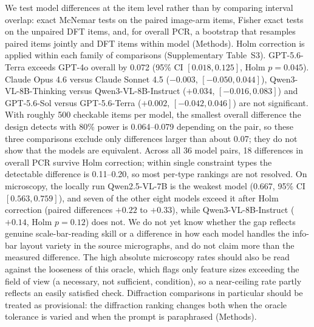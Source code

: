 \documentclass[pdflatex,sn-nature]{sn-jnl}
\newcommand{\rev}[1]{#1} %
\newcommand{\rev}[1]{{\color{blue}#1}} %
\providecommand{\DIFadd}[1]{{\protect\color{blue} \sf #1}} %
\providecommand{\DIFdel}[1]{{\protect\color{red} \scriptsize #1}} %
\providecommand{\DIFaddbegin}{} %
\providecommand{\DIFaddend}{} %
\providecommand{\DIFdelbegin}{} %
\providecommand{\DIFdelend}{} %
\providecommand{\DIFscaledelfig}{0.5}
\newlength{\DIFdelgraphicswidth} %
\newlength{\DIFdelgraphicsheight} %
\providecommand{\DIFaddincludegraphics}[2][]{{\color{blue}\fbox{\DIFOincludegraphics[#1]{#2}}}} %
\providecommand{\DIFdelincludegraphics}[2][]{%
\sbox{\DIFdelgraphicsbox}{\DIFOincludegraphics[#1]{#2}}%
\settoboxwidth{\DIFdelgraphicswidth}{\DIFdelgraphicsbox} %
\settoboxtotalheight{\DIFdelgraphicsheight}{\DIFdelgraphicsbox} %
\scalebox{\DIFscaledelfig}{%
\parbox[b]{\DIFdelgraphicswidth}{\usebox{\DIFdelgraphicsbox}\\[-\baselineskip] \rule{\DIFdelgraphicswidth}{0em}}\llap{\resizebox{\DIFdelgraphicswidth}{\DIFdelgraphicsheight}{%
\setlength{\unitlength}{\DIFdelgraphicswidth}%
\begin{picture}(1,1)%
\thicklines\linethickness{2pt} %
{\color[rgb]{1,0,0}\put(0,0){\framebox(1,1){}}}%
{\color[rgb]{1,0,0}\put(0,0){\line( 1,1){1}}}%
{\color[rgb]{1,0,0}\put(0,1){\line(1,-1){1}}}%
\end{picture}%
}\hspace*{3pt}}} %
} %
\DeclareRobustCommand{\DIFaddbegin}{\DIFOaddbegin \let\includegraphics\DIFaddincludegraphics} %
\DeclareRobustCommand{\DIFaddend}{\DIFOaddend \let\includegraphics\DIFOincludegraphics} %
\DeclareRobustCommand{\DIFdelbegin}{\DIFOdelbegin \let\includegraphics\DIFdelincludegraphics} %
\DeclareRobustCommand{\DIFdelend}{\DIFOaddend \let\includegraphics\DIFOincludegraphics} %
\begin{document}
\DIFadd{\rev{We test model differences at the item level rather than by comparing interval overlap:
exact McNemar tests on the paired image-arm items, Fisher exact tests on the unpaired DFT items,
and, for overall PCR, a bootstrap that resamples paired items jointly and DFT items within
model (Methods). Holm correction is applied within each family of comparisons (Supplementary
Table~S3). GPT-5.6-Terra exceeds GPT-4o overall by 0.072 (95\% CI $[0.018,0.125]$, Holm
$p=0.045$). Claude Opus 4.6 versus Claude Sonnet 4.5 ($-0.003$, $[-0.050,0.044]$),
Qwen3-VL-8B-Thinking versus Qwen3-VL-8B-Instruct ($+0.034$, $[-0.016,0.083]$) and
GPT-5.6-Sol versus GPT-5.6-Terra ($+0.002$, $[-0.042,0.046]$) are not significant. With
roughly 500 checkable items per model, the smallest overall difference the design detects with
80\% power is 0.064--0.079 depending on the pair, so these three comparisons exclude only
differences larger than about 0.07; they do not show that the models are equivalent. Across all
36 model pairs, 18 differences in overall PCR survive Holm correction; within single
constraint types the detectable difference is 0.11--0.20, so most per-type rankings are not
resolved. On microscopy, the locally run Qwen2.5-VL-7B is the weakest model (0.667, 95\% CI
$[0.563,0.759]$), and seven of the other eight models exceed it after Holm correction (paired
differences $+0.22$ to $+0.33$), while Qwen3-VL-8B-Instruct ($+0.14$, Holm $p=0.12$) does not.} }\DIFaddend We do not
\DIFdelbegin \DIFdel{yet }\DIFdelend know whether the gap reflects genuine scale-bar-reading skill or a difference in how each model handles the
info-bar layout variety in the source micrographs, and do not claim more than the
measured difference. The high absolute microscopy rates should also be read against the
looseness of this oracle, which flags only feature sizes exceeding the field of view (a
necessary, not sufficient, condition), so a near-ceiling rate partly reflects an easily
satisfied check. \DIFaddbegin \DIFadd{\rev{Diffraction comparisons in particular should be treated as provisional:
the diffraction ranking changes both when the oracle tolerance is varied and when the prompt is
paraphrased (Methods).}
}\DIFaddend 
\end{document}
